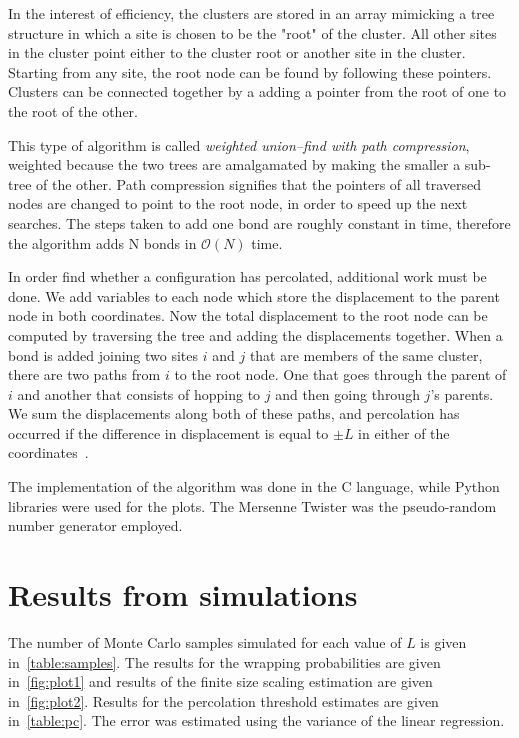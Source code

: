 In the interest of efficiency, the clusters are stored in an array mimicking a tree structure in which a site is chosen to be the "root" of the cluster. All other sites in the cluster point either to the cluster root or another site in the cluster. Starting from any site, the root node can be found by following these pointers. Clusters can be connected together by a adding a pointer from the root of one to the root of the other.

This type of algorithm is called \emph{weighted union–find with path compression}, weighted because the two trees are amalgamated by making the smaller a sub-tree of the other. Path compression signifies that the pointers of all traversed nodes are changed to point to the root node, in order to speed up the next searches. The steps taken to add one bond are roughly constant in time, therefore the algorithm adds N bonds in $\mathcal O(N)$ time.

In order find whether a configuration has percolated, additional work must be done. We add variables to each node which store the displacement to the parent node in both coordinates. Now the total displacement to the root node can be computed by traversing the tree and adding the displacements together. When a bond is added joining two sites $i$ and $j$ that are members of the same cluster, there are two paths from $i$ to the root node. One that goes through the parent of $i$ and another that consists of hopping to $j$ and then going through $j$'s parents. We sum the displacements along both of these paths, and percolation has occurred if the difference in displacement is equal to $\pm L$ in either of the coordinates~\cite{Mertens_2012}. 

The implementation of the algorithm was done in the C language, while Python libraries were used for the plots. The Mersenne Twister was the pseudo-random number generator employed. 

\section{Results from simulations}
The number of Monte Carlo samples simulated for each value of $L$ is given in~\autoref{table:samples}.
The results for the wrapping probabilities are given in~\autoref{fig:plot1} and results of the finite size scaling estimation are given in~\autoref{fig:plot2}. Results for the percolation threshold estimates are given in~\autoref{table:pc}. The error was estimated using the variance of the linear regression.

